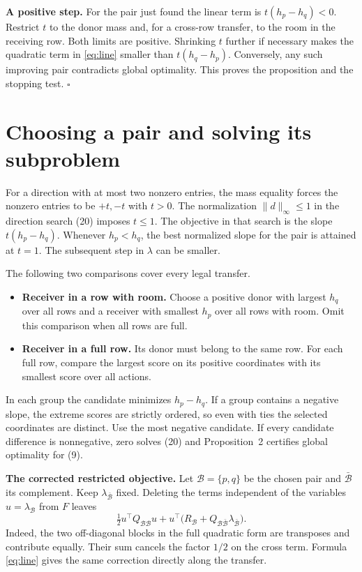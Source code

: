 \documentclass[12pt,a4paper]{article}
\newcommand{\lead}[1]{\par\smallskip\noindent\textbf{#1}\enspace}
\begin{document}
\lead{A positive step.}
For the pair just found the linear term is \(t(h_p-h_q)<0\). Restrict
\(t\) to the donor mass and, for a cross-row transfer, to the room in
the receiving row. Both limits are positive. Shrinking \(t\) further
if necessary makes the quadratic term in \eqref{eq:line} smaller than
\(t(h_q-h_p)\). Conversely, any such improving pair contradicts global
optimality. This proves the proposition and the stopping test. \hfill\(\square\)

\newpage
\section*{Choosing a pair and solving its subproblem}
For a direction with at most two nonzero entries, the mass equality
forces the nonzero entries to be \(+t,-t\) with \(t>0\).
The normalization \(\|d\|_\infty\le1\) in the direction search (20)
imposes \(t\le1\). The objective in that search is the slope
\(t(h_p-h_q)\). Whenever \(h_p<h_q\), the best normalized slope for the
pair is attained at \(t=1\). The subsequent step in \(\lambda\) can be smaller.

The following two comparisons cover every legal transfer.
\begin{itemize}
 \item \textbf{Receiver in a row with room.} Choose a positive donor with
 largest \(h_q\) over all rows and a receiver with smallest \(h_p\) over
 all rows with room. Omit this comparison when all rows are full.
 \item \textbf{Receiver in a full row.} Its donor must belong to the
 same row. For each full row, compare the largest score on its positive
 coordinates with its smallest score over all actions.
\end{itemize}
In each group the candidate minimizes \(h_p-h_q\). If a group contains
a negative slope, the extreme scores are strictly ordered, so even
with ties the selected coordinates are distinct. Use the most negative
candidate. If every candidate difference is nonnegative, zero solves
(20) and Proposition~2 certifies global optimality for (9).

\lead{The corrected restricted objective.}
Let \(\mathcal B=\{p,q\}\) be the chosen pair and \(\bar{\mathcal B}\)
its complement. Keep \(\lambda_{\bar{\mathcal B}}\) fixed. Deleting the
terms independent of the variables \(u=\lambda_{\mathcal B}\) from
\(F\) leaves
\begin{equation}
 \tfrac12 u^\top Q_{\mathcal B\mathcal B}u+
 u^\top\bigl(R_{\mathcal B}
       + Q_{\mathcal B\bar{\mathcal B}}\lambda_{\bar{\mathcal B}}\bigr).
 \tag{22$'$}\label{eq:block}
\end{equation}
Indeed, the two off-diagonal blocks in the full quadratic form are
transposes and contribute equally. Their sum cancels the factor \(1/2\)
on the cross term. Formula \eqref{eq:line} gives the same correction
directly along the transfer.
\end{document}

